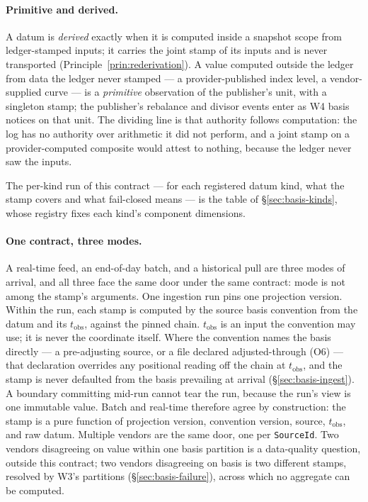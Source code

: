\paragraph{Primitive and derived.} A datum is \emph{derived} exactly when it is
computed inside a snapshot scope from ledger-stamped inputs; it carries the joint
stamp of its inputs and is never transported (Principle~\ref{prin:rederivation}).
A value computed outside the ledger from data the ledger never stamped --- a
provider-published index level, a vendor-supplied curve --- is a \emph{primitive}
observation of the publisher's unit, with a singleton stamp; the publisher's
rebalance and divisor events enter as W4 basis notices on that unit. The dividing
line is that authority follows computation: the log has no authority over
arithmetic it did not perform, and a joint stamp on a provider-computed composite
would attest to nothing, because the ledger never saw the inputs.

The per-kind run of this contract --- for each registered datum kind, what the stamp
covers and what fail-closed means --- is the table of \S\ref{sec:basis-kinds}, whose
registry fixes each kind's component dimensions.

\paragraph{One contract, three modes.} A real-time feed, an end-of-day batch, and
a historical pull are three modes of arrival, and all three face the same door
under the same contract: mode is not among the stamp's arguments. One ingestion
run pins one projection version. Within the run, each stamp is computed by the
source basis convention from the datum and its $t_{\mathrm{obs}}$, against the
pinned chain. $t_{\mathrm{obs}}$ is an input the convention may use; it is never
the coordinate itself. Where the convention names the basis directly --- a
pre-adjusting source, or a file declared adjusted-through (O6) --- that
declaration overrides any positional reading off the chain at
$t_{\mathrm{obs}}$, and the stamp is never defaulted from the basis prevailing
at arrival (\S\ref{sec:basis-ingest}). A boundary committing mid-run cannot tear
the run, because the run's view is one immutable value. Batch and real-time
therefore agree by construction: the stamp is a pure function of projection
version, convention version, source, $t_{\mathrm{obs}}$, and raw datum. Multiple
vendors are the same door, one per \texttt{SourceId}. Two vendors disagreeing on
value within one basis partition is a data-quality question, outside this
contract; two vendors disagreeing on basis is two different stamps, resolved by
W3's partitions (\S\ref{sec:basis-failure}), across which no aggregate can be
computed.

